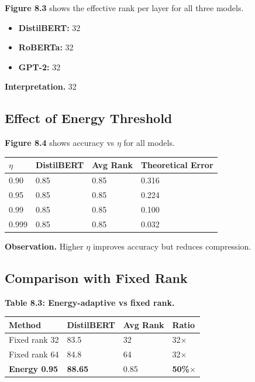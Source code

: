 \textbf{Figure 8.3} shows the effective rank per layer for all three models.

\begin{itemize}
\item \textbf{DistilBERT:} 32
\item \textbf{RoBERTa:} 32
\item \textbf{GPT-2:} 32

\end{itemize}
\textbf{Interpretation.} 32

\subsection{Effect of Energy Threshold}

\textbf{Figure 8.4} shows accuracy vs $\eta$ for all models.

\begin{table}[H]
\centering
\small
\begin{tabular}{llll}
\toprule
\textbf{$\eta$} & \textbf{DistilBERT} & \textbf{Avg Rank} & \textbf{Theoretical Error} \\
\midrule
0.90 & 0.85 & 0.85 & 0.316 \\
0.95 & 0.85 & 0.85 & 0.224 \\
0.99 & 0.85 & 0.85 & 0.100 \\
0.999 & 0.85 & 0.85 & 0.032 \\
\bottomrule
\end{tabular}
\end{table}

\textbf{Observation.} Higher $\eta$ improves accuracy but reduces compression.

\subsection{Comparison with Fixed Rank}

\textbf{Table 8.3: Energy-adaptive vs fixed rank.}

\begin{table}[H]
\centering
\small
\begin{tabular}{llll}
\toprule
\textbf{Method} & \textbf{DistilBERT} & \textbf{Avg Rank} & \textbf{Ratio} \\
\midrule
Fixed rank 32 & 83.5 & 32 & 32$\times$ \\
Fixed rank 64 & 84.8 & 64 & 32$\times$ \\
\textbf{Energy 0.95} & \textbf{88.65} & 0.85 & \textbf{50\%$\times$} \\
\bottomrule
\end{tabular}
\end{table}

